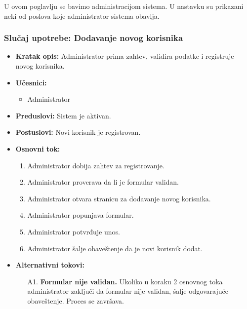 \documentclass[titlepage]{article}
\begin{document}
U ovom poglavlju se bavimo administracijom sistema. U nastavku su prikazani neki od poslova koje administrator sistema obavlja.

\subsubsection{Slučaj upotrebe: Dodavanje novog korisnika}

\begin{itemize}
    \item \textbf{Kratak opis:} Administrator prima zahtev, validira podatke i registruje novog korisnika.
    \item \textbf{Učesnici:}
        \begin{itemize}
            \item Administrator
        \end{itemize}
    \item \textbf{Preduslovi:} Sistem je aktivan.
    \item \textbf{Postuslovi:} Novi korisnik je registrovan.
    \item \textbf{Osnovni tok:}
        \begin{enumerate}
            \item Administrator dobija zahtev za registrovanje.
            \item Administrator proverava da li je formular validan.
            \item Administrator otvara stranicu za dodavanje novog korisnika.
            \item Administrator popunjava formular.
            \item Administrator potvrđuje unos.
            \item Administrator šalje obaveštenje da je novi korisnik dodat.
        \end{enumerate}  
    
    \item \textbf{Alternativni tokovi:}
        \begin{itemize}
            \item[A1.] \textbf{Formular nije validan.} Ukoliko u koraku 2 osnovnog toka administrator zaključi da formular nije validan, šalje odgovarajuće obaveštenje. Proces se završava.
        \end{itemize}
\end{itemize}
\end{document}

